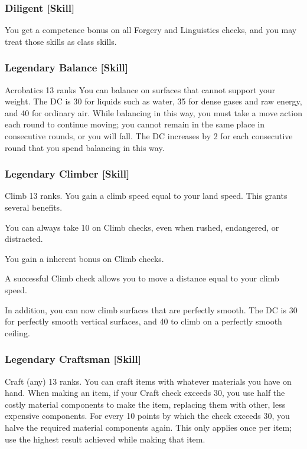 \subsubsection{Diligent [Skill]}
 You get a  competence bonus on all Forgery and Linguistics checks, and you may treat those skills as class skills.

\subsubsection{Legendary Balance [Skill]}
\featpre Acrobatics 13 ranks
\featben You can balance on surfaces that cannot support your weight. The DC is 30 for liquids such as water, 35 for dense gases and raw energy, and 40 for ordinary air. While balancing in this way, you must take a move action each round to continue moving; you cannot remain in the same place in consecutive rounds, or you will fall. The DC increases by 2 for each consecutive round that you spend balancing in this way.

\subsubsection{Legendary Climber [Skill]}
\featpre Climb 13 ranks.
\featben You gain a climb speed equal to your land speed. This grants several benefits. 
\begin{itemize*}
  \item You can always take 10 on Climb checks, even when rushed, endangered, or distracted. 
  \item You gain a  inherent bonus on Climb checks.
  \item A successful Climb check allows you to move a distance equal to your climb speed.
\end{itemize*}

In addition, you can now climb surfaces that are perfectly smooth. The DC is 30 for perfectly smooth vertical surfaces, and 40 to climb on a perfectly smooth ceiling.

\subsubsection{Legendary Craftsman [Skill]}
\featpre Craft (any) 13 ranks.
\featben You can craft items with whatever materials you have on hand. When making an item, if your Craft check exceeds 30, you use half the costly material components to make the item, replacing them with other, less expensive components. For every 10 points by which the check exceeds 30, you halve the required material components again. This only applies once per item; use the highest result achieved while making that item.

